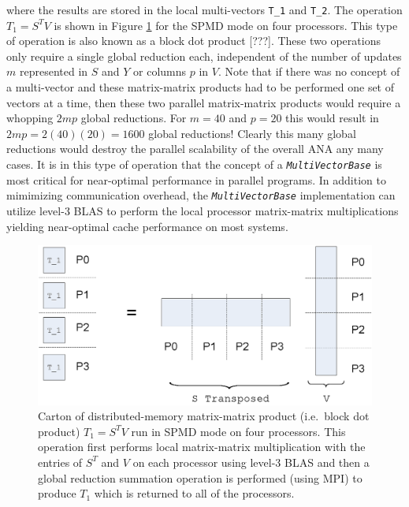 \documentclass[pdf,ps2pdf,11pt]{SANDreport}
\begin{document}
{}\noindent{}where the results are stored in the local multi-vectors
{}\texttt{T\_1} and {}\texttt{T\_2}.  The operation $T_1 = S^T V$ is
shown in Figure {}\ref{tsfcore:fig:SPMD_Block_Dot_Prod_P4} for the
SPMD mode on four processors.  This type of operation is also known as
a block dot product [???].  These two operations only require a single
global reduction each, independent of the number of updates $m$
represented in $S$ and $Y$ or columns $p$ in $V$.  Note that if there
was no concept of a multi-vector and these matrix-matrix products had
to be performed one set of vectors at a time, then these two parallel
matrix-matrix products would require a whopping $2 m p$ global
reductions.  For $m = 40$ and $p = 20$ this would result in $2 m p =
2(40)(20) = 1600$ global reductions!  Clearly this many global
reductions would destroy the parallel scalability of the overall ANA
any many cases.  It is in this type of operation that the concept of a
{}\texttt{\textit{Multi\-Vector\-Base}} is most critical for near-optimal
performance in parallel programs.  In addition to mimimizing
communication overhead, the {}\texttt{\textit{Multi\-Vector\-Base}}
implementation can utilize level-3 BLAS to perform the local processor
matrix-matrix multiplications yielding near-optimal cache performance
on most systems.

{\bsinglespace
\begin{figure}
\begin{center}
\includegraphics*[angle=0,scale=0.60]{SPMD_Block_Dot_Prod_P4}
\end{center}
\caption{
\label{tsfcore:fig:SPMD_Block_Dot_Prod_P4}
Carton of distributed-memory matrix-matrix product (i.e.~block dot
product) $T_1 = S^T V$ run in SPMD mode on four processors.  This
operation first performs local matrix-matrix multiplication with the
entries of $S^T$ and $V$ on each processor using level-3 BLAS and then
a global reduction summation operation is performed (using MPI) to
produce $T_1$ which is returned to all of the processors.}
\end{figure}
\esinglespace}
\end{document}
